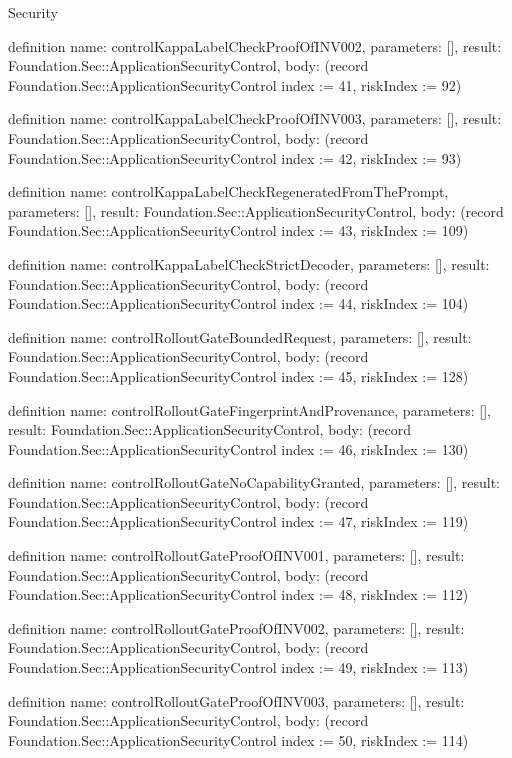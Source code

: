 \begin{lexlean}{Security}
\begin{semanticmodule}
definition{
  name: controlKappaLabelCheckProofOfINV002,
  parameters: [],
  result: Foundation.Sec::ApplicationSecurityControl,
  body: (record Foundation.Sec::ApplicationSecurityControl {index := 41, riskIndex := 92})
}

definition{
  name: controlKappaLabelCheckProofOfINV003,
  parameters: [],
  result: Foundation.Sec::ApplicationSecurityControl,
  body: (record Foundation.Sec::ApplicationSecurityControl {index := 42, riskIndex := 93})
}

definition{
  name: controlKappaLabelCheckRegeneratedFromThePrompt,
  parameters: [],
  result: Foundation.Sec::ApplicationSecurityControl,
  body: (record Foundation.Sec::ApplicationSecurityControl {index := 43, riskIndex := 109})
}

definition{
  name: controlKappaLabelCheckStrictDecoder,
  parameters: [],
  result: Foundation.Sec::ApplicationSecurityControl,
  body: (record Foundation.Sec::ApplicationSecurityControl {index := 44, riskIndex := 104})
}

definition{
  name: controlRolloutGateBoundedRequest,
  parameters: [],
  result: Foundation.Sec::ApplicationSecurityControl,
  body: (record Foundation.Sec::ApplicationSecurityControl {index := 45, riskIndex := 128})
}

definition{
  name: controlRolloutGateFingerprintAndProvenance,
  parameters: [],
  result: Foundation.Sec::ApplicationSecurityControl,
  body: (record Foundation.Sec::ApplicationSecurityControl {index := 46, riskIndex := 130})
}

definition{
  name: controlRolloutGateNoCapabilityGranted,
  parameters: [],
  result: Foundation.Sec::ApplicationSecurityControl,
  body: (record Foundation.Sec::ApplicationSecurityControl {index := 47, riskIndex := 119})
}

definition{
  name: controlRolloutGateProofOfINV001,
  parameters: [],
  result: Foundation.Sec::ApplicationSecurityControl,
  body: (record Foundation.Sec::ApplicationSecurityControl {index := 48, riskIndex := 112})
}

definition{
  name: controlRolloutGateProofOfINV002,
  parameters: [],
  result: Foundation.Sec::ApplicationSecurityControl,
  body: (record Foundation.Sec::ApplicationSecurityControl {index := 49, riskIndex := 113})
}

definition{
  name: controlRolloutGateProofOfINV003,
  parameters: [],
  result: Foundation.Sec::ApplicationSecurityControl,
  body: (record Foundation.Sec::ApplicationSecurityControl {index := 50, riskIndex := 114})
}


\end{semanticmodule}
\end{lexlean}
